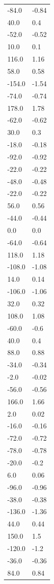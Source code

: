 \begin{longtable}{ll}
-84.0 & -0.84 \\
40.0 & 0.4 \\
-52.0 & -0.52 \\
10.0 & 0.1 \\
116.0 & 1.16 \\
58.0 & 0.58 \\
-154.0 & -1.54 \\
-74.0 & -0.74 \\
178.0 & 1.78 \\
-62.0 & -0.62 \\
30.0 & 0.3 \\
-18.0 & -0.18 \\
-92.0 & -0.92 \\
-22.0 & -0.22 \\
-48.0 & -0.48 \\
-22.0 & -0.22 \\
56.0 & 0.56 \\
-44.0 & -0.44 \\
0.0 & 0.0 \\
-64.0 & -0.64 \\
118.0 & 1.18 \\
-108.0 & -1.08 \\
14.0 & 0.14 \\
-106.0 & -1.06 \\
32.0 & 0.32 \\
108.0 & 1.08 \\
-60.0 & -0.6 \\
40.0 & 0.4 \\
88.0 & 0.88 \\
-34.0 & -0.34 \\
-2.0 & -0.02 \\
-56.0 & -0.56 \\
166.0 & 1.66 \\
2.0 & 0.02 \\
-16.0 & -0.16 \\
-72.0 & -0.72 \\
-78.0 & -0.78 \\
-20.0 & -0.2 \\
6.0 & 0.06 \\
-96.0 & -0.96 \\
-38.0 & -0.38 \\
-136.0 & -1.36 \\
44.0 & 0.44 \\
150.0 & 1.5 \\
-120.0 & -1.2 \\
-36.0 & -0.36 \\
84.0 & 0.84 \\

\end{longtable}
